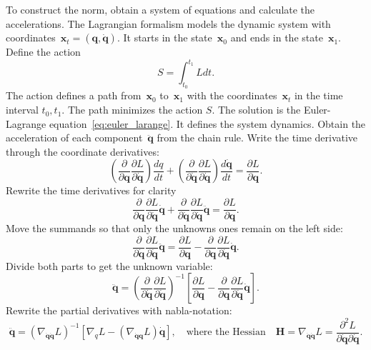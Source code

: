 \documentclass[sn-mathphys-num]{sn-jnl}
\theoremstyle{thmstylethree}
\theoremstyle{thmstyletwo}
\theoremstyle{thmstyleone}
\begin{document}
To construct the norm, obtain a system of equations  and calculate the accelerations. The Lagrangian formalism models the dynamic system with coordinates~$\mathbf{x}_t = (\mathbf{q}, \dot{\mathbf{q}})$. It starts in the state~$\mathbf{x}_0$ and ends in the state~$\mathbf{x}_1$. Define the action  
\[ %
S=\int_{t_{0}}^{t_{1}} L d t.
\]%
The action defines a path from~$\mathbf{x}_0$ to~$\mathbf{x}_1$ with the coordinates~$\mathbf{x}_t$ in the time interval $t_0, t_1$. The path minimizes the action $S$. %
The solution is the Euler-Lagrange equation~\eqref{eq:euler_larange}. It defines the system dynamics. 
Obtain the acceleration of each component~$ \ddot{\mathbf{q}}$ from the chain rule. Write the time derivative through the coordinate derivatives:
\[
\left(\frac{\partial}{\partial \mathbf{q}} \frac{\partial L}{\partial \dot{\mathbf{q}}} \right) \frac{d q}{d t}+\left(\frac{\partial}{\partial \dot{\mathbf{q}}} \frac{\partial L}{\partial \dot{\mathbf{q}}} \right)  \frac{d \dot{\mathbf{q}}}{d t}
= \frac{\partial L}{\partial \mathbf{q}}.
\]
Rewrite the time derivatives for clarity
\[
\frac{\partial}{\partial \mathbf{q}} \frac{\partial L}{\partial \dot{\mathbf{q}}} \dot{\mathbf{q}}+\frac{\partial}{\partial \dot{\mathbf{q}}} \frac{\partial L}{\partial \dot{\mathbf{q}}} \ddot{\mathbf{q}} 
= \frac{\partial L}{\partial \mathbf{q}}.
\]
Move the summands so that only the unknowns ones remain on the left side:
\[
\frac{\partial}{\partial \dot{\mathbf{q}}} \frac{\partial L}{\partial \dot{\mathbf{q}}} \ddot{\mathbf{q}} 
= \frac{\partial L}{\partial \mathbf{q}}-\frac{\partial}{\partial \mathbf{q}} \frac{\partial L}{\partial \dot{\mathbf{q}}} \dot{\mathbf{q}}.
\]
Divide both parts to get  the unknown variable:
\[
\ddot{\mathbf{q}} 
= \left(\frac{\partial}{\partial \dot{\mathbf{q}}} \frac{\partial L}{\partial \dot{\mathbf{q}}}\right)^{-1}\left[\frac{\partial L}{\partial \mathbf{q}}-\frac{\partial}{\partial \mathbf{q}} \frac{\partial L}{\partial \dot{\mathbf{q}}} \dot{\mathbf{q}}\right].
\]
Rewrite the partial derivatives with nabla-notation:
\begin{equation}
\ddot{\mathbf{q}} 
= \left(\nabla_{\dot{\mathbf{q}} \dot{\mathbf{q}}} L\right)^{-1}\left[\nabla_{q} L-\left(\nabla_{\dot{\mathbf{q}}\mathbf{q}} L\right) \dot{\mathbf{q}}\right], \quad\text{where the Hessian}\quad
\mathbf{H} = \nabla_{\dot{\mathbf{q}}\dot{\mathbf{q}}} L = \frac{\partial^{2} L}{\partial \dot{\mathbf{q}} \partial \dot{\mathbf{q}}}.
\end{equation}
\end{document}
